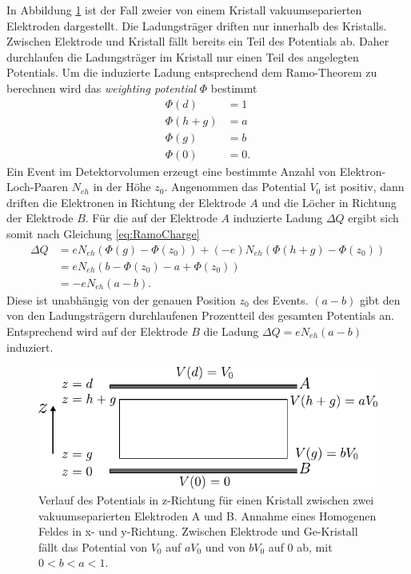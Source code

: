 In Abbildung \ref{fig:RamoDeLight} ist der Fall zweier von einem Kristall vakuumseparierten Elektroden dargestellt.
Die Ladungsträger driften nur innerhalb des Kristalls.
Zwischen Elektrode und Kristall fällt bereits ein Teil des Potentials ab.
Daher durchlaufen die Ladungsträger im Kristall nur einen Teil des angelegten Potentials.
Um die induzierte Ladung entsprechend dem Ramo-Theorem zu berechnen wird das \textit{weighting potential} $\Phi$ bestimmt
\begin{align*}
\Phi(d) &= 1 \\
\Phi(h+g) &= a\\
\Phi(g) &= b\\
\Phi(0) &= 0.
\end{align*}
Ein Event im Detektorvolumen erzeugt eine bestimmte Anzahl von Elektron-Loch-Paaren $N_{eh}$ in der Höhe $z_0$.
Angenommen das Potential $V_0$ ist positiv, dann driften die Elektronen in Richtung der 
Elektrode $A$ und die Löcher in Richtung der Elektrode $B$.
Für die auf der Elektrode $A$ induzierte Ladung $\Delta Q$ ergibt sich somit nach Gleichung \eqref{eq:RamoCharge}
\begin{align}
\Delta Q &= e N_{eh}(\Phi(g) - \Phi(z_0)) + (-e)N_{eh}(\Phi(h+g) - \Phi(z_0)) \nonumber \\
&= eN_{eh}\left(b - \Phi(z_0) - a + \Phi(z_0)\right) \nonumber \\
&= -eN_{eh}(a-b).
\label{eq:RamoCharge}
\end{align}
Diese ist unabhängig von der genauen Position $z_0$ des Events.
$(a-b)$ gibt den von den Ladungsträgern durchlaufenen Prozentteil des gesamten Potentials an.
Entsprechend wird auf der Elektrode $B$ die Ladung $\Delta Q = eN_{eh}(a-b)$ induziert.


\begin{figure}[!t]
\begin{center}
\includegraphics[scale=1.25]{./fig/ElektrodenDeLight.pdf}
\end{center}
\vspace{-0.5cm}
\caption{Verlauf des Potentials in z-Richtung für einen Kristall zwischen zwei vakuumseparierten Elektroden A und B.
Annahme eines Homogenen Feldes in x- und y-Richtung. 
Zwischen Elektrode und Ge-Kristall fällt das Potential von $V_0$ auf $aV_0$ und von $bV_0$ auf $0$ ab, mit $0 < b < a < 1$.}
\label{fig:RamoDeLight}
\end{figure}